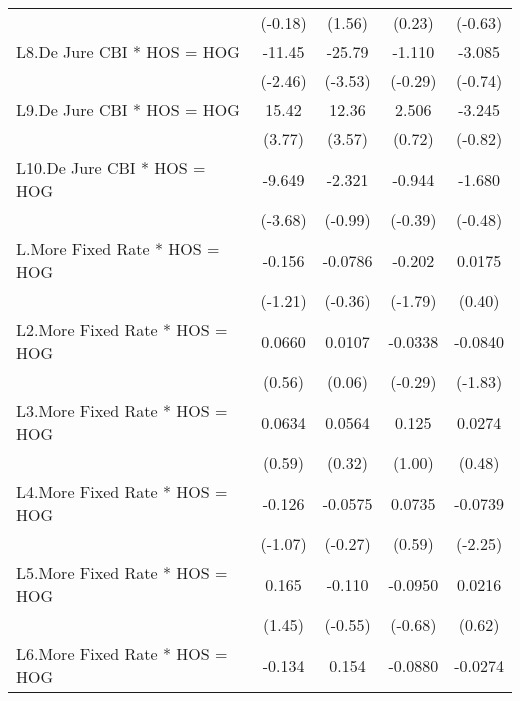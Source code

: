 {\begin{longtable}{l*{4}{c}}
                &  (-0.18)         &   (1.56)         &   (0.23)         &  (-0.63)         \\
\addlinespace
L8.De Jure CBI * HOS = HOG&   -11.45\sym{*}  &   -25.79\sym{***}&   -1.110         &   -3.085         \\
                &  (-2.46)         &  (-3.53)         &  (-0.29)         &  (-0.74)         \\
\addlinespace
L9.De Jure CBI * HOS = HOG&    15.42\sym{***}&    12.36\sym{***}&    2.506         &   -3.245         \\
                &   (3.77)         &   (3.57)         &   (0.72)         &  (-0.82)         \\
\addlinespace
L10.De Jure CBI * HOS = HOG&   -9.649\sym{***}&   -2.321         &   -0.944         &   -1.680         \\
                &  (-3.68)         &  (-0.99)         &  (-0.39)         &  (-0.48)         \\
\addlinespace
L.More Fixed Rate * HOS = HOG&   -0.156         &  -0.0786         &   -0.202         &   0.0175         \\
                &  (-1.21)         &  (-0.36)         &  (-1.79)         &   (0.40)         \\
\addlinespace
L2.More Fixed Rate * HOS = HOG&   0.0660         &   0.0107         &  -0.0338         &  -0.0840         \\
                &   (0.56)         &   (0.06)         &  (-0.29)         &  (-1.83)         \\
\addlinespace
L3.More Fixed Rate * HOS = HOG&   0.0634         &   0.0564         &    0.125         &   0.0274         \\
                &   (0.59)         &   (0.32)         &   (1.00)         &   (0.48)         \\
\addlinespace
L4.More Fixed Rate * HOS = HOG&   -0.126         &  -0.0575         &   0.0735         &  -0.0739\sym{*}  \\
                &  (-1.07)         &  (-0.27)         &   (0.59)         &  (-2.25)         \\
\addlinespace
L5.More Fixed Rate * HOS = HOG&    0.165         &   -0.110         &  -0.0950         &   0.0216         \\
                &   (1.45)         &  (-0.55)         &  (-0.68)         &   (0.62)         \\
\addlinespace
L6.More Fixed Rate * HOS = HOG&   -0.134         &    0.154         &  -0.0880         &  -0.0274         \\

\end{longtable}}
